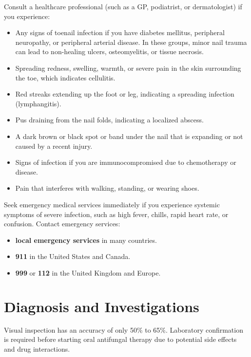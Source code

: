 Consult a healthcare professional (such as a GP, podiatrist, or dermatologist) if you experience:
\begin{itemize}
    \item Any signs of toenail infection if you have diabetes mellitus, peripheral neuropathy, or peripheral arterial disease. In these groups, minor nail trauma can lead to non-healing ulcers, osteomyelitis, or tissue necrosis.
    \item Spreading redness, swelling, warmth, or severe pain in the skin surrounding the toe, which indicates cellulitis.
    \item Red streaks extending up the foot or leg, indicating a spreading infection (lymphangitis).
    \item Pus draining from the nail folds, indicating a localized abscess.
    \item A dark brown or black spot or band under the nail that is expanding or not caused by a recent injury.
    \item Signs of infection if you are immunocompromised due to chemotherapy or disease.
    \item Pain that interferes with walking, standing, or wearing shoes.
\end{itemize}

Seek emergency medical services immediately if you experience systemic symptoms of severe infection, such as high fever, chills, rapid heart rate, or confusion. Contact emergency services:
\begin{itemize}
    \item \textbf{local emergency services} in many countries.
    \item \textbf{911} in the United States and Canada.
    \item \textbf{999} or \textbf{112} in the United Kingdom and Europe.
\end{itemize}

\section*{Diagnosis and Investigations}
Visual inspection has an accuracy of only 50\% to 65\%. Laboratory confirmation is required before starting oral antifungal therapy due to potential side effects and drug interactions.

